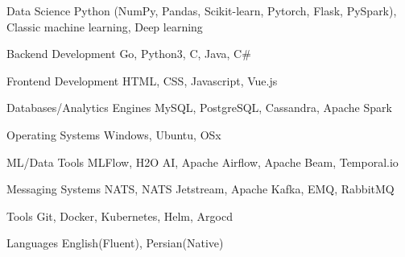 

\begin{cvskills}

  \cvskill
    {Data Science} %
    {Python (NumPy, Pandas, Scikit-learn, Pytorch, Flask, PySpark), Classic machine learning, Deep learning} %

  \cvskill
    {Backend Development} %
    {Go, Python3, C, Java, C\#} %

  \cvskill
    {Frontend Development} %
    {HTML, CSS, Javascript, Vue.js} %

  \cvskill
    {Databases/Analytics Engines} %
    {MySQL, PostgreSQL, Cassandra, Apache Spark} %

  \cvskill
    {Operating Systems} %
    {Windows, Ubuntu, OSx} %

  \cvskill
    {ML/Data Tools} %
    {MLFlow, H2O AI, Apache Airflow, Apache Beam, Temporal.io} %

  \cvskill
    {Messaging Systems} %
    {NATS, NATS Jetstream, Apache Kafka, EMQ, RabbitMQ} %

  \cvskill
    {Tools} %
    {Git, Docker, Kubernetes, Helm, Argocd} %

  \cvskill
    {Languages} %
    {English(Fluent), Persian(Native)} %

\end{cvskills}
